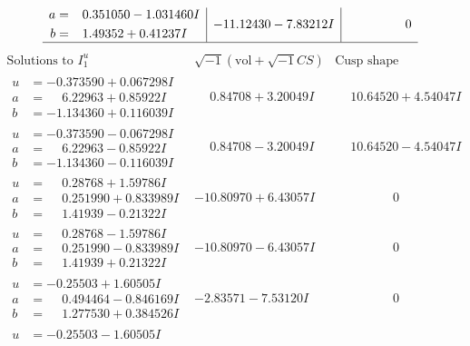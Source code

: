 \documentclass[1p]{elsarticle_modified}
\theoremstyle{definition}
\newcommand{\I}{\sqrt{-1}}
\begin{document}
$$\begin{array}{c|c|c}
\begin{aligned}
a &= \phantom{-}0.351050 - 1.031460 I \\
b &= \phantom{-}1.49352 + 0.41237 I\end{aligned}
 & -11.12430 - 7.83212 I & \phantom{-0.000000 } 0\\
 \hline 
 \end{array}$$\newpage$$\begin{array}{c|c|c}  
\text{Solutions to }I^u_{1}& \I (\text{vol} + \sqrt{-1}CS) & \text{Cusp shape}\\
 \hline 
\begin{aligned}
u &= -0.373590 + 0.067298 I \\
a &= \phantom{-}6.22963 + 0.85922 I \\
b &= -1.134360 + 0.116039 I\end{aligned}
 & \phantom{-}0.84708 + 3.20049 I & \phantom{-}10.64520 + 4.54047 I \\ \hline\begin{aligned}
u &= -0.373590 - 0.067298 I \\
a &= \phantom{-}6.22963 - 0.85922 I \\
b &= -1.134360 - 0.116039 I\end{aligned}
 & \phantom{-}0.84708 - 3.20049 I & \phantom{-}10.64520 - 4.54047 I \\ \hline\begin{aligned}
u &= \phantom{-}0.28768 + 1.59786 I \\
a &= \phantom{-}0.251990 + 0.833989 I \\
b &= \phantom{-}1.41939 - 0.21322 I\end{aligned}
 & -10.80970 + 6.43057 I & \phantom{-0.000000 } 0 \\ \hline\begin{aligned}
u &= \phantom{-}0.28768 - 1.59786 I \\
a &= \phantom{-}0.251990 - 0.833989 I \\
b &= \phantom{-}1.41939 + 0.21322 I\end{aligned}
 & -10.80970 - 6.43057 I & \phantom{-0.000000 } 0 \\ \hline\begin{aligned}
u &= -0.25503 + 1.60505 I \\
a &= \phantom{-}0.494464 - 0.846169 I \\
b &= \phantom{-}1.277530 + 0.384526 I\end{aligned}
 & -2.83571 - 7.53120 I & \phantom{-0.000000 } 0 \\ \hline\begin{aligned}
u &= -0.25503 - 1.60505 I \\

\end{aligned}
\end{array}$$
\end{document}
